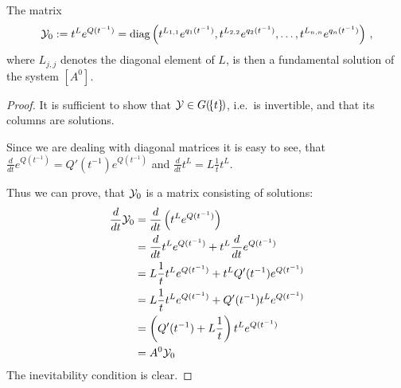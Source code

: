 \begin{lem}
  The matrix
  \[
    \mathcal{Y}_0:=t^Le^{Q(t^{-1})}=\operatorname{diag}\left(
      t^{L_{1,1}}e^{q_1(t^{-1})},
      t^{L_{2,2}}e^{q_2(t^{-1})},\dots,
      t^{L_{n,n}}e^{q_n(t^{-1})}
    \right) \,,
  \]
  where $L_{j,j}$ denotes the  diagonal element of $L$, is then
  a fundamental solution of the system $[A^0]$.
\end{lem}
\begin{proof}
  It is sufficient to show that $\mathcal{Y}\in G(\!\{t\}\!)$, i.e.\ is invertible, and
  that its columns are solutions.

  \begin{comment}
    Since we are dealing with diagonal matrices it is easy to see, that
    \begin{align*}
      \frac{d}{dt}e^{Q(t^{-1})}
      &=\diag\left(\frac{d}{dt}e^{q_1(t^{-1})},\frac{d}{dt}e^{q_2(t^{-1})}
        ,\dots,
        \frac{d}{dt}e^{q_n(t^{-1})}\right)
        \\&=\diag\left(\frac{d}{dt}q_1(t^{-1})e^{q_1(t^{-1})}
                      ,\frac{d}{dt}q_1(t^{-1})e^{q_2(t^{-1})}
                      ,\dots
                      ,\frac{d}{dt}q_1(t^{-1})e^{q_n(t^{-1})}\right)
    \\&=Q'(t^{-1})e^{Q(t^{-1})} \,.
    \end{align*}
    and, since the function $t^L$ is defined as $e^{L\ln t}$,
    \begin{align*}
      \frac{d}{dt}t^L&=\frac{d}{dt}e^{L\ln t}
    \\&=Le^{(L-\id)\ln t}
    \\&=L\frac{1}{t}t^L \,.
    \end{align*}
  \end{comment}
  Since we are dealing with diagonal matrices it is easy to see, that
  $\frac{d}{dt}e^{Q(t^{-1})}=Q'(t^{-1})e^{Q(t^{-1})}$ and
  $\frac{d}{dt}t^L=L\frac{1}{t}t^L$.

  Thus we can prove, that $\mathcal{Y}_0$ is a matrix consisting of solutions:
  \begin{align*}
    \frac{d}{dt}\mathcal{Y}_0
    &=\frac{d}{dt}\left(t^Le^{Q(t^{-1})}\right)
  \\&=\frac{d}{dt}t^Le^{Q(t^{-1})}+t^L\frac{d}{dt}e^{Q(t^{-1})}
  \\&=L\frac{1}{t}t^Le^{Q(t^{-1})}+t^LQ'(t^{-1})e^{Q(t^{-1})}
  \\&=L\frac{1}{t}t^Le^{Q(t^{-1})}+Q'(t^{-1})t^Le^{Q(t^{-1})}
  \\&=\left(Q'(t^{-1})+L\frac{1}{t}\right)t^Le^{Q(t^{-1})}
  \\&=A^0\mathcal{Y}_0
  \end{align*}
  The inevitability condition is clear.
\end{proof}


